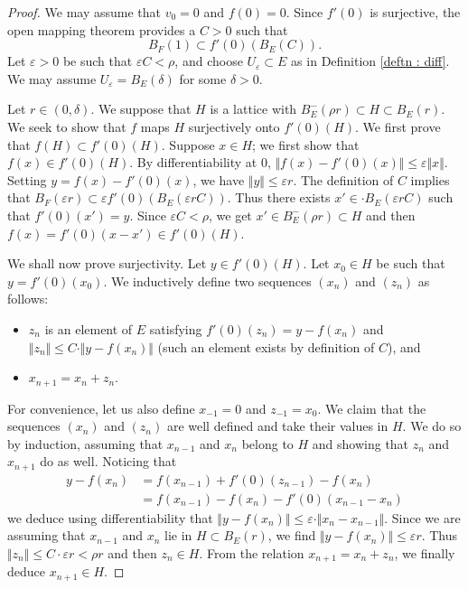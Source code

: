 \documentclass{lms}
\begin{document}
\begin{proof} %
We may assume that $v_0=0$ and $f(0)=0$. Since $f'(0)$ is surjective, the open mapping theorem provides a $C>0$ such that 
$$B_F(1) \subset f'(0)(B_E(C)).$$
Let $\varepsilon>0$ be such that 
$\varepsilon C < \rho$, and choose $U_\varepsilon \subset E$ as in Definition 
\ref{deftn : diff}.  We may assume $U_\varepsilon = B_E(\delta)$ for some $\delta >0$.

Let $r \in (0, \delta)$. We suppose that $H$ is a lattice with 
$B^-_E(\rho r) \subset H \subset B_E(r).$
We seek to show that $f$ maps $H$ surjectively onto $f'(0) (H)$. We first prove 
that $f(H) \subset f'(0) (H)$. Suppose $x \in H$; we first show that $f(x) \in f'(0)(H)$.  By differentiability at 
$0$, $\Vert f(x)-f'(0)(x) \Vert \leq \varepsilon \Vert x \Vert $. 
Setting $y=f(x)-f'(0)(x)$, we have $\Vert y \Vert \leq 
\varepsilon r$. The definition of $C$ implies that $B_F(\varepsilon r) 
\subset \varepsilon f'(0) (B_E(\varepsilon rC))$. Thus there exists $x' 
\in \cdot B_E(\varepsilon r C)$ such that $f'(0) (x') =y$. Since 
$\varepsilon C < \rho$, we get $x' \in B^-_E(\rho r) \subset H$ and 
then $f(x)= f'(0) (x-x') \in f'(0) (H)$.

We shall now prove surjectivity. Let $y \in f'(0) (H)$. Let $x_0 \in H$ 
be such that $y = f'(0) (x_0)$. We inductively define two sequences 
$(x_n)$ and $(z_n)$ as follows:
\begin{itemize}
\item $z_n$ is an element of $E$ satisfying $f'(0)(z_n) = y - 
f(x_n)$ and $\Vert z_n \Vert \leq C \cdot \Vert y - f(x_n) \Vert$ (such 
an element exists by definition of $C$), and
\item $x_{n+1}=x_n+z_n$.
\end{itemize}
For convenience, let us also define $x_{-1} = 0$ and $z_{-1}=x_0.$ We claim that the 
sequences $(x_n)$ and $(z_n)$ are well defined and take their values in 
$H$. We do so by induction, assuming that $x_{n-1}$ and $x_n$ belong to $H$
and showing that $z_n$ and $x_{n+1}$ do as well. Noticing
that 
\begin{equation}
\label{eq:mainlemma}
\begin{aligned}
y - f(x_n) &= f(x_{n-1}) + f'(0)(z_{n-1}) - f(x_n) \\
&= f(x_{n-1}) - f(x_n) - f'(0)(x_{n-1} - x_n)
\end{aligned}
\end{equation}
we deduce using differentiability that
$\Vert y - f(x_n) \Vert \leq \varepsilon \cdot \Vert x_n - x_{n-1}
\Vert$.
Since we are assuming that $x_{n-1}$ and $x_n$ lie in $H \subset
B_E(r)$, we find $\Vert y - f(x_n) \Vert \leq \varepsilon r$. Thus
$\Vert z_n \Vert \leq C \cdot \varepsilon r < \rho r$ and then
$z_n \in H$. From the relation $x_{n+1} = x_n + z_n$, we finally
deduce $x_{n+1} \in H$.


\end{proof}
\end{document}
